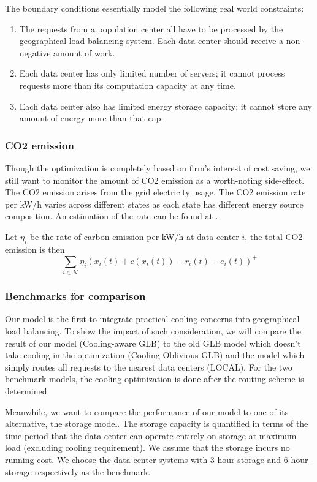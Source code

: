\documentclass{acm_proc_article-sp}
\begin{document}
The boundary conditions essentially model the following real world constraints:
\begin{enumerate}
\item
The requests from a population center all have to be processed by the geographical load balancing system. Each data center should receive a non-negative amount of work.
\item
Each data center has only limited number of servers; it cannot process requests more than its computation capacity at any time.
\item
Each data center also has limited energy storage capacity; it cannot store any amount of energy more than that cap.
\end{enumerate}
\subsubsection{CO2 emission}
Though the optimization is completely based on firm's interest of cost saving, we still want to monitor the amount of CO2 emission as a worth-noting side-effect. The CO2 emission arises from the grid electricity usage. The CO2 emission rate per kW/h varies across different states as each state has different energy source composition. An estimation of the rate can be found at \cite{carbon}.

Let $\eta_i$ be the rate of carbon emission per kW/h at data center $i$, the total CO2 emission is then
$$\sum_{i \in \mathcal{N}} \eta_i(x_i(t) + c(x_i(t)) - r_i(t) - e_i(t))^+$$
\subsubsection{Benchmarks for comparison}
Our model is the first to integrate practical cooling concerns into geographical load balancing. To show the impact of such consideration, we will compare the result of our model (Cooling-aware GLB) to the old GLB model which doesn't take cooling in the optimization (Cooling-Oblivious GLB) and the model which simply routes all requests to the nearest data centers (LOCAL). For the two benchmark models, the cooling optimization is done after the routing scheme is determined.

Meanwhile, we want to compare the performance of our model to one of its alternative, the storage model. The storage capacity is quantified in terms of the time period that the data center can operate entirely on storage at maximum load (excluding cooling requirement). We assume that the storage incurs no running cost. We choose the data center systems with 3-hour-storage and 6-hour-storage respectively as the benchmark.
\end{document}
